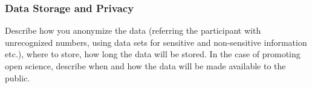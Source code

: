 \subsubsection{Data Storage and Privacy}
\begin{prereg}
\begin{instruction}
Describe how you anonymize the data (referring the participant with unrecognized numbers, using data sets for sensitive and non-sensitive information etc.), where to store, how long the data will be stored. In the case of promoting open science, describe when and how the data will be made available to the public.
\end{instruction}
\end{prereg}